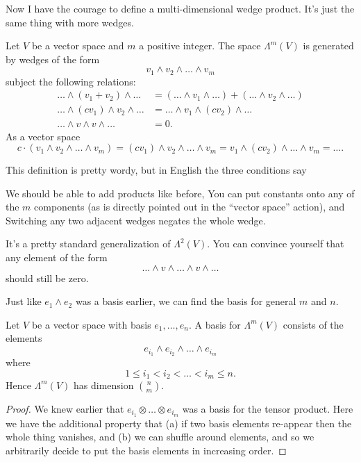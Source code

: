 Now I have the courage to define a multi-dimensional wedge product.
It's just the same thing with more wedges.
\begin{definition}
	Let $V$ be a vector space and $m$ a positive integer.
	The space $\Lambda^m(V)$ is generated by wedges of the form
	\[ v_1 \wedge v_2 \wedge \dots \wedge v_m \]
	subject the following relations:
	\begin{align*}
		\dots \wedge (v_1+v_2) \wedge \dots
			&= (\dots \wedge v_1 \wedge \dots)
			 + (\dots \wedge v_2 \wedge \dots) \\
		\dots \wedge (cv_1) \wedge v_2 \wedge \dots
			&= \dots \wedge v_1 \wedge (cv_2) \wedge \dots  \\
		\dots \wedge v \wedge v \wedge \dots
			&= 0.
	\end{align*}
	As a vector space
	\[ c \cdot (v_1 \wedge v_2 \wedge \dots \wedge v_m)
	 = (cv_1) \wedge v_2 \wedge \dots \wedge v_m
	 = v_1 \wedge (cv_2) \wedge \dots \wedge v_m
	 = \dots .
	\]
\end{definition}
This definition is pretty wordy, but in English the three conditions say
\begin{itemize}
	\ii We should be able to add products like before,
	\ii You can put constants onto any of the $m$ components
	(as is directly pointed out in the ``vector space'' action), and
	\ii Switching any two adjacent wedges negates the whole wedge.
\end{itemize}
It's a pretty standard generalization of $\Lambda^2(V)$.
You can convince yourself that any element of the form
\[ \dots \wedge v \wedge \dots \wedge v \wedge \dots \]
should still be zero.

Just like $e_1 \wedge e_2$ was a basis earlier, we can find the basis
for general $m$ and $n$.
\begin{proposition}
	Let $V$ be a vector space with basis $e_1, \dots, e_n$.
	A basis for $\Lambda^m(V)$ consists of the elements
	\[ e_{i_1} \wedge e_{i_2} \wedge \dots \wedge e_{i_m} \]
	where
	\[ 1 \le i_1 < i_2 < \dots < i_m \le n. \]
	Hence $\Lambda^m(V)$ has dimension $\binom nm$.
\end{proposition}
\begin{proof}
	We knew earlier that $e_{i_1} \otimes \dots \otimes e_{i_m}$ was a basis for the tensor product.
	Here we have the additional property that (a) if two basis elements re-appear then the whole thing vanishes, and
	(b) we can shuffle around elements, and so we arbitrarily decide to put the basis elements
	in increasing order.
\end{proof}


